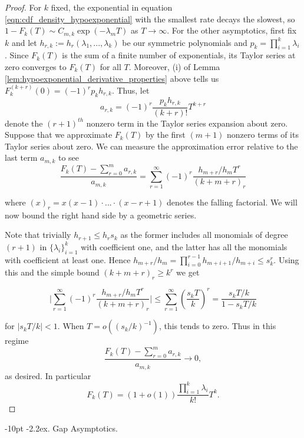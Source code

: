 \documentclass[10pt,oneside,reqno]{article}
\makeatletter
\theoremstyle{plain}
\theoremstyle{definition}
\numberwithin{equation}{section}
\def\subsubsection#1{\@startsection{subsubsection}{3}{0pt}%
{\medskipamount}%
{-10pt}%
{\normalsize\itshape}{\kern-2.2ex. #1.}}
\renewcommand{\leq}{\leqslant}
\renewcommand{\geq}{\geqslant}
\makeatother
\begin{document}
\begin{proof}
 For $k$ fixed, the exponential in equation \ref{eqn:cdf_density_hypoexponential} with the smallest rate decays the slowest, so $1-F_k(T) \sim C_{m,k}\exp(-\lambda_m T)$ as $T \to \infty$. For the other asymptotics, first fix $k$ and let $h_{r,k} := h_r(\lambda_1, ..., \lambda_k)$ be our symmetric polynomials and $p_k = \prod_{i=1}^k \lambda_i$. Since $F_k(T)$ is the sum of a finite number of exponentials, its Taylor series at zero converges to $F_k(T)$ for all $T$. Moreover, (i) of Lemma \ref{lem:hypoexponential_derivative_properties} above tells us $F_k^{(k+r)}(0) = (-1)^r p_k h_{r,k}$. Thus, let
%
\[a_{r,k} = (-1)^r \frac{p_k h_{r,k}}{(k+r)!} T^{k+r}\]
%
\noindent denote the $(r+1)^{th}$ nonzero term in the Taylor series expansion about zero. Suppose that we approximate $F_k(T)$ by the first $(m+1)$ nonzero terms of its Taylor series about zero. We can measure the approximation error relative to the last term $a_{m,k}$ to see
%
\[\frac{F_k(T) - \sum_{r=0}^{m} a_{r,k}}{a_{m, k}} = \sum_{r=1}^\infty (-1)^r\frac{h_{m+r}/h_mT^r}{(k+m+r)_r}\]

\noindent where $(x)_r = x(x-1) \cdot ... \cdot (x-r+1)$ denotes the falling factorial. We will now bound the right hand side by a geometric series.

Note that trivially $h_{r+1} \leq h_r s_k$ as the former includes all monomials of degree $(r+1)$ in $\{\lambda_i\}_{i=1}^k$ with coefficient one, and the latter has all the monomials with coefficient at least one. Hence $h_{m+r} / h_m = \prod_{i=0}^{r-1} h_{m+i+1}/h_{m+i} \leq s_k^r$. Using this and the simple bound $(k + m + r)_r \geq k^r$ we get

\[\bigg|\sum_{r=1}^\infty (-1)^r\frac{h_{m+r}/h_mT^r}{(k+m+r)_r}\bigg| \leq \sum_{r=1}^\infty \left(\frac{s_kT}{k}\right)^r = \frac{s_kT/k}{1 - s_k T/k}\]

\noindent for $|s_kT/k| < 1$. When $T = o((s_k/k)^{-1})$, this tends to zero.  Thus in this regime
%
\[\frac{F_k(T) - \sum_{r=0}^{m} a_{r,k}}{a_{m, k}} \to 0,\]
%
 \noindent as desired. In particular
%
\[F_k(T) = (1 + o(1)) \frac{\prod_{i=1}^k \lambda_i}{k!} T^{k}.\]
%
\end{proof}



\subsubsection{Gap Asymptotics}
\label{app:gap-asymptotics}
\end{document}

